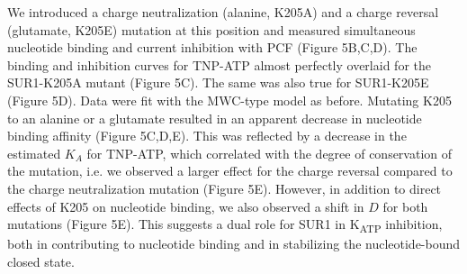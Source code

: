 \documentclass[9pt,lineno, onehalfspacing]{elife_modified}
\begin{document}
We introduced a charge neutralization (alanine, K205A) and a charge reversal (glutamate, K205E) mutation at this position and measured simultaneous nucleotide binding and current inhibition with PCF (Figure 5B,C,D).
The binding and inhibition curves for TNP-ATP almost perfectly overlaid for the SUR1-K205A mutant (Figure 5C).
The same was also true for SUR1-K205E (Figure 5D).
Data were fit with the MWC-type model as before.
Mutating K205 to an alanine or a glutamate resulted in an apparent decrease in nucleotide binding affinity (Figure 5C,D,E).
This was reflected by a decrease in the estimated $K_A$ for TNP-ATP, which correlated with the degree of conservation of the mutation, i.e. we observed a larger effect for the charge reversal compared to the charge neutralization mutation (Figure 5E).
However, in addition to direct effects of K205 on nucleotide binding, we also observed a shift in $D$ for both mutations (Figure 5E).
This suggests a dual role for SUR1 in K\textsubscript{ATP} inhibition, both in contributing to nucleotide binding and in stabilizing the nucleotide-bound closed state.
\end{document}
